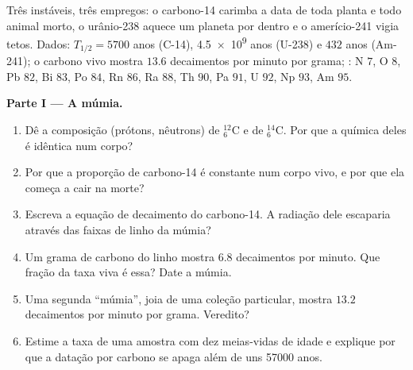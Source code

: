 \begin{problem}
\label{pb:g11:nucleus-radioactivity:1}
Três  instáveis, três empregos: o carbono-14 carimba a data de
toda planta e todo animal morto, o urânio-238 aquece um planeta por
dentro e o amerício-241 vigia tetos. Dados:
$T_{1/2} = \num{5700}$ anos (C-14), \num{4.5e9} anos (U-238) e $432$ anos
(Am-241); o carbono vivo mostra $13.6$ decaimentos por minuto por grama;
: N $7$, O $8$, Pb $82$, Bi $83$, Po $84$, Rn $86$, Ra
$88$, Th $90$, Pa $91$, U $92$, Np $93$, Am $95$.

\medskip
\noindent\textbf{Parte I --- A múmia.}
\begin{enumerate}
  \item Dê a composição (prótons, nêutrons) de ${}^{12}_{6}\mathrm{C}$ e
        de ${}^{14}_{6}\mathrm{C}$. Por que a química deles é idêntica num
        corpo?
  \item Por que a proporção de carbono-14 é constante num corpo vivo, e
        por que ela começa a cair na morte?
  \item Escreva a equação de decaimento do carbono-14. A radiação dele
        escaparia através das faixas de linho da múmia?
  \item Um grama de carbono do linho mostra $6.8$ decaimentos por minuto.
        Que fração da taxa viva é essa? Date a múmia.
  \item Uma segunda ``múmia'', joia de uma coleção particular, mostra
        $13.2$ decaimentos por minuto por grama. Veredito?
  \item Estime a taxa de uma amostra com dez meias-vidas de idade e
        explique por que a datação por carbono se apaga além de uns
        \num{57000} anos.
\end{enumerate}


\end{problem}
